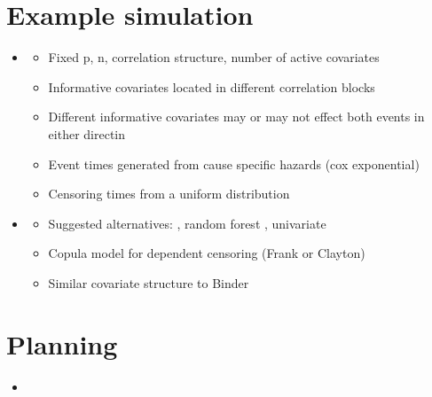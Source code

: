 \documentclass[11pt,a4paper]{article}
\let\cite\parencite
\begin{document}
\section{Example simulation}
\begin{itemize}
\item \cite{Binder2009}
    \begin{itemize}
    \item Fixed p, n, correlation structure, number of active covariates
    \item Informative covariates located in different correlation blocks
    \item Different informative covariates may or may not effect both events in either directin
    \item Event times generated from cause specific hazards (cox exponential)
    \item Censoring times from a uniform distribution
    \end{itemize}
\item \cite{EmuraChen2016}
\begin{itemize}
    \item Suggested alternatives: \cite{Binder2009, Chen2010}, random forest \cite{MogensenGerds2013}, univariate
    \item Copula model for dependent censoring (Frank or Clayton)
    \item Similar covariate structure to Binder
\end{itemize}
\end{itemize}

\section{Planning}
\begin{itemize}
    \item 
\end{itemize}



\newpage
\printbibliography[heading=bibintoc]
\end{document}
